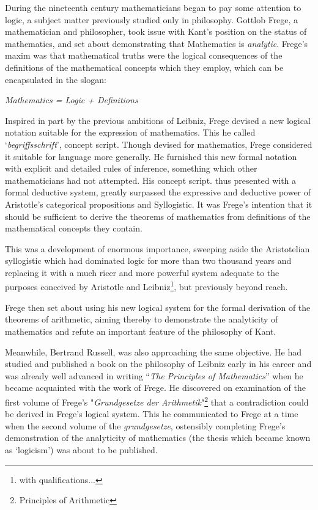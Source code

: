 During the nineteenth century mathematicians began to pay some attention to logic, a subject matter previously studied only in philosophy.
Gottlob Frege, a mathematician and philosopher, took issue with Kant's position on the status of mathematics, and set about demonstrating that Mathematics is \emph{analytic}.
Frege's maxim was that mathematical truths were the logical consequences of the definitions of the mathematical concepts which they employ, which can be encapsulated in the slogan:

\begin{center}
  {\it Mathematics = Logic + Definitions}
\end{center}

  
Inspired in part by the previous ambitions of Leibniz, Frege devised a new logical notation suitable for the expression of mathematics.
This he called `\emph{begriffsschrift}', concept script.
Though devised for mathematics, Frege considered it suitable for language more generally.
He furnished this new formal notation with explicit and detailed rules of inference, something which other mathematicians had not attempted.
His concept script. thus presented with a formal deductive system, greatly surpassed the expressive and deductive power of Aristotle's categorical propositions and Syllogistic.
It was Frege's intention that it should be sufficient to derive the theorems of mathematics from definitions of the mathematical concepts they contain.

This was a development of enormous importance, sweeping aside the Aristotelian syllogistic which had dominated logic for more than two thousand years and replacing it with a much ricer and more powerful system adequate to the purposes conceived by Aristotle and Leibniz\footnote{with qualifications...}, but previously beyond reach.

Frege then set about using his new logical system for the formal derivation of the theorems of arithmetic, aiming thereby to demonstrate the analyticity of mathematics and refute an important feature of the philosophy of Kant.

Meanwhile, Bertrand Russell, was also approaching the same objective.
He had studied and published a book \cite{russellPL} on the philosophy of Leibniz early in his career and was already well advanced in writing ``\emph{The Principles of Mathematics}'' \cite{russellPRM} when he became acquainted with the work of Frege.
He discovered on examination of the first volume of Frege's "\emph{Grundgesetze der Arithmetik}"\footnote{Principles of Arithmetic} \cite{frege1893} that a contradiction could be derived in Frege's logical system.
This he communicated to Frege at a time when the second volume of the \emph{grundgesetze}, ostensibly completing
Frege's demonstration of the analyticity of mathematics (the thesis which became known as `logicism') was about to be published.

